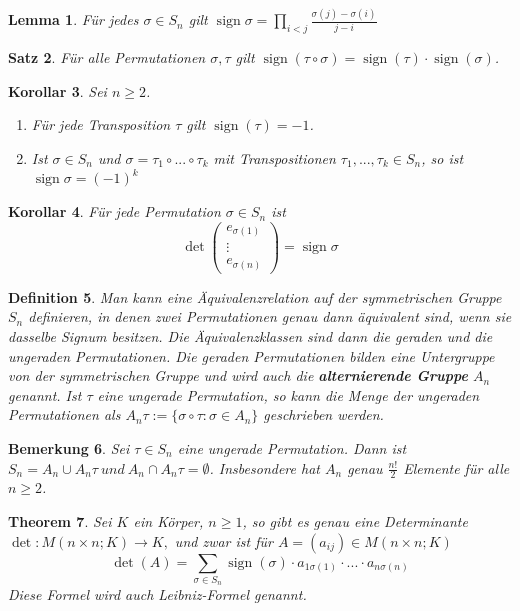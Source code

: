 \documentclass[12pt,a4paper]{article}
\theoremstyle{plain}
\newtheorem{Theorem}{Theorem}[section]
\newtheorem{Satz}[Theorem]{Satz}
\newtheorem{Lemma}[Theorem]{Lemma}
\newtheorem{Korollar}[Theorem]{Korollar}
\newtheorem{Definition}[Theorem]{Definition}
\newtheorem{Bemerkung}[Theorem]{Bemerkung}
\newcommand{\herv}[1]{{\emph{\textbf{#1}}}}
\numberwithin{equation}{section}
\begin{document}
\begin{Lemma}
Für jedes $\sigma\in S_n$ gilt
$\operatorname{sign}\sigma = \prod_{i<j}\frac{\sigma(j)-\sigma(i)}{j-i}$
\end{Lemma}
\begin{Satz}
Für alle Permutationen $\sigma,\tau$ gilt $\operatorname{sign}(\tau\circ\sigma)=\operatorname{sign}(\tau)\cdot\operatorname{sign}(\sigma)$.
\end{Satz}
\begin{Korollar}
Sei $n\geq 2$.
\begin{enumerate}
\renewcommand{\labelenumi}{\emph{\arabic{enumi})}}
\item Für jede Transposition $\tau$ gilt $\operatorname{sign}(\tau)=-1$.
\item Ist $\sigma\in S_n$ und $\sigma=\tau_1\circ...\circ\tau_k$ mit Transpositionen $\tau_1,...,\tau_k\in S_n$, so ist $\operatorname{sign}\sigma=(-1)^k$
\end{enumerate}
\end{Korollar}
\begin{Korollar}
Für jede Permutation $\sigma\in S_n$ ist
\[\det\begin{pmatrix} e_{\sigma(1)}\\\vdots\\e_{\sigma(n)}\end{pmatrix}=\operatorname{sign}\sigma\]
\end{Korollar}
\begin{Definition}
Man kann eine Äquivalenzrelation auf der symmetrischen Gruppe $S_n$ definieren, in denen zwei Permutationen genau dann äquivalent sind, wenn sie dasselbe Signum besitzen. Die Äquivalenzklassen sind dann die geraden und die ungeraden Permutationen. Die geraden Permutationen bilden eine Untergruppe von der symmetrischen Gruppe und wird auch die \herv{alternierende Gruppe} $A_n$ genannt. Ist $\tau$ eine ungerade Permutation, so kann die Menge der ungeraden Permutationen als $A_n \tau:=\{\sigma\circ\tau\colon\sigma\in A_n\}$ geschrieben werden.
\end{Definition}
\begin{Bemerkung}
Sei $\tau\in S_n$ eine ungerade Permutation. Dann ist $S_n=A_n\cup A_n\tau\ und\ A_n\cap A_n\tau=\emptyset$.
Insbesondere hat $A_n$ genau $\frac{n!}2$ Elemente für alle $n\geq 2$.
\end{Bemerkung}
\begin{Theorem}
Sei $K$ ein Körper, $n\geq 1$, so gibt es genau eine Determinante
$\det\colon M(n\times n;K)\rightarrow K,$
und zwar ist für $A=(a_{ij})\in M(n\times n;K)$
\[\det(A)=\sum_{\sigma\in S_n} \operatorname{sign}(\sigma)\cdot a_{1\sigma(1)}\cdot...\cdot a_{n\sigma(n)}\]
Diese Formel wird auch Leibniz-Formel genannt.
\end{Theorem}
\end{document}
